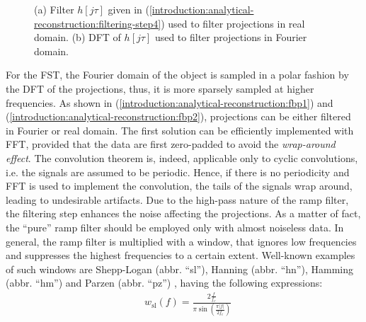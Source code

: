 {\begin{figure}[!b]
   \caption[Ramp filter in real and Fourier domain.]{(a) Filter $h[j\tau]$ given in (\ref{introduction:analytical-reconstruction:filtering-step4}) used to filter projections in
             real domain. (b) DFT of $h[j\tau]$ used to filter projections in
             Fourier domain.}%
    \label{introduction:fbp:ramp-filter}%
\end{figure}
For the FST, the Fourier domain of the object is sampled in a polar fashion by the DFT
of the projections, thus, it is more sparsely sampled at higher frequencies.
\newline
As shown in (\ref{introduction:analytical-reconstruction:fbp1}) and (\ref{introduction:analytical-reconstruction:fbp2}),
projections can be either filtered in Fourier or real domain. The first solution can be efficiently implemented with FFT,
provided that the data are first zero-padded to avoid the \emph{wrap-around effect}. The convolution theorem is, indeed, 
applicable only to cyclic convolutions, i.e. the signals are assumed to be periodic.
Hence, if there is no periodicity and FFT is used to implement the convolution,
the tails of the signals wrap around, leading to undesirable artifacts.
\newline
Due to the high-pass nature of the ramp filter, the filtering step enhances the noise affecting the projections.
As a matter of fact, the ``pure'' ramp filter should be employed only with almost noiseless data. 
In general, the ramp filter is multiplied with a window, that ignores low frequencies and suppresses the highest frequencies to a certain extent.
Well-known examples of such windows are Shepp-Logan (abbr. ``sl''), Hanning (abbr. ``hn''),
Hamming (abbr. ``hm'') and 
Parzen (abbr. ``pz'') \cite{Lyra2011}, having the following expressions:
\begin{align*}
  & w_{\text{sl}}(f) = \frac{\displaystyle2\frac{f}{f_{c}}}{\displaystyle\pi \sin\left( \frac{\pi|f|}{2f_{c}} \right)} \nonumber\\[1em]

\end{align*}}
